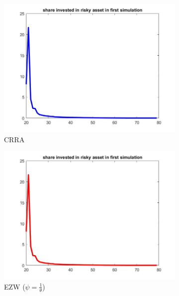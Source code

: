 \documentclass[12pt,a4paper]{article}
\begin{document}
\begin{figure}[h!]
  \centering
  \begin{subfigure}[b]{0.32\linewidth}
    \includegraphics[width=\linewidth]{graphs/Q2/share.jpg}
    \caption{CRRA}
  \end{subfigure}
  \begin{subfigure}[b]{0.32\linewidth}
      \includegraphics[width=\linewidth]{graphs/Q4/share_ezw--.jpg}
      \caption{EZW ($\psi = \frac{1}{\theta}$)}
  \end{subfigure}
  \begin{subfigure}[b]{0.32\linewidth}

\end{subfigure}
\end{figure}
\end{document}
